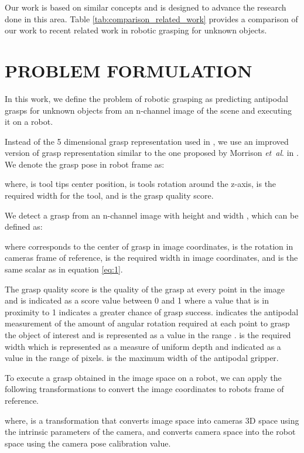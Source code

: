 \documentclass[letterpaper, 10pt, conference]{IEEEtran}
\newcommand{\etal}{\textit{et~al}. }
\begin{document}
Our work is based on similar concepts and is designed to advance the research done in this area. Table \ref{tab:comparison_related_work} provides a comparison of our work to recent related work in robotic grasping for unknown objects.



\section{PROBLEM FORMULATION}
In this work, we define the problem of robotic grasping as predicting antipodal grasps for unknown objects from an n-channel image of the scene and executing it on a robot.

Instead of the 5 dimensional grasp representation used in \cite{lenz2015deep, redmon2015real, kumra2017robotic}, we use an improved version of grasp representation similar to the one proposed by Morrison \etal in \cite{morrison2019learning}. We denote the grasp pose in robot frame as:

where,  is tool tip\textquotesingle s center position,  is tools rotation around the z-axis,  is the required width for the tool, and  is the grasp quality score.

We detect a grasp from an n-channel image  with height  and width , which can be defined as:

where  corresponds to the center of grasp in image coordinates,  is the rotation in camera\textquotesingle s frame of reference,  is the required width in image coordinates, and  is the same scalar as in equation \eqref{eq:1}.

The grasp quality score  is the quality of the grasp at every point in the image and is indicated as a score value between 0 and 1 where a value that is in proximity to 1 indicates a greater chance of grasp success.  indicates the antipodal measurement of the amount of angular rotation required at each point to grasp the object of interest and is represented as a value in the range .  is the required width which is represented as a measure of uniform depth and indicated as a value in the range of  pixels.  is the maximum width of the antipodal gripper.

To execute a grasp obtained in the image space on a robot, we can apply the following transformations to convert the image coordinates to robot\textquotesingle s frame of reference.

where,  is a transformation that converts image space into camera\textquotesingle s 3D space using the intrinsic parameters of the camera, and  converts camera space into the robot space using the camera pose calibration value. 
\end{document}
